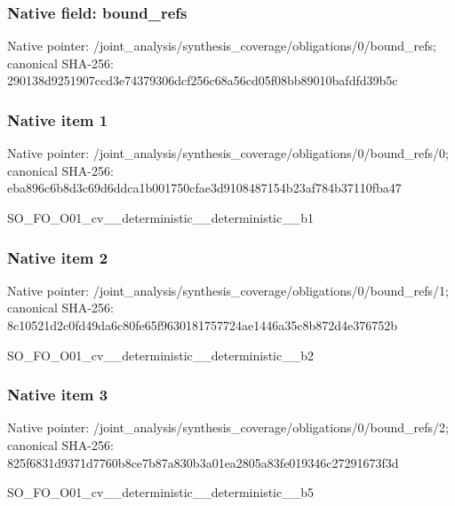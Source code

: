 \documentclass[10pt,a4paper]{article}
\begin{document}
\subsubsection{Native field: bound\_\allowbreak{}refs}
Native pointer: /joint\_\allowbreak{}analysis/synthesis\_\allowbreak{}coverage/obligations/0/bound\_\allowbreak{}refs; canonical SHA-256: 290138d9251907ccd3e74379306dcf256c68a56cd05f08bb89010bafdfd39b5c

\subsubsection{Native item 1}
Native pointer: /joint\_\allowbreak{}analysis/synthesis\_\allowbreak{}coverage/obligations/0/bound\_\allowbreak{}refs/0; canonical SHA-256: eba896c6b8d3c69d6ddca1b001750cfae3d9108487154b23af784b37110fba47

\begingroup\raggedright\sloppy SO\_\allowbreak{}FO\_\allowbreak{}O01\_\allowbreak{}cv\_\allowbreak{}\_\allowbreak{}deterministic\_\allowbreak{}\_\allowbreak{}deterministic\_\allowbreak{}\_\allowbreak{}b1\par\endgroup

\subsubsection{Native item 2}
Native pointer: /joint\_\allowbreak{}analysis/synthesis\_\allowbreak{}coverage/obligations/0/bound\_\allowbreak{}refs/1; canonical SHA-256: 8c10521d2c0fd49da6c80fe65f9630181757724ae1446a35c8b872d4e376752b

\begingroup\raggedright\sloppy SO\_\allowbreak{}FO\_\allowbreak{}O01\_\allowbreak{}cv\_\allowbreak{}\_\allowbreak{}deterministic\_\allowbreak{}\_\allowbreak{}deterministic\_\allowbreak{}\_\allowbreak{}b2\par\endgroup

\subsubsection{Native item 3}
Native pointer: /joint\_\allowbreak{}analysis/synthesis\_\allowbreak{}coverage/obligations/0/bound\_\allowbreak{}refs/2; canonical SHA-256: 825f6831d9371d7760b8ce7b87a830b3a01ea2805a83fe019346c27291673f3d

\begingroup\raggedright\sloppy SO\_\allowbreak{}FO\_\allowbreak{}O01\_\allowbreak{}cv\_\allowbreak{}\_\allowbreak{}deterministic\_\allowbreak{}\_\allowbreak{}deterministic\_\allowbreak{}\_\allowbreak{}b5\par\endgroup
\end{document}
